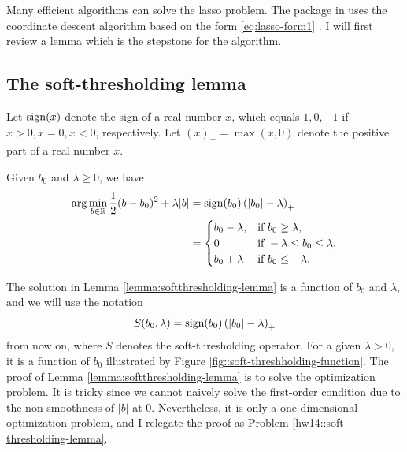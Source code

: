 Many efficient algorithms can solve the lasso problem. The  package in  uses the coordinate descent algorithm based on the form \eqref{eq:lasso-form1} \citep{friedman2007pathwise, friedman2010regularization}. I will first review a lemma which is the stepstone for the algorithm. 


\subsection{The soft-thresholding lemma}


Let $\textup{sign}(x)$ denote the sign of a real number $x$, which equals $1, 0, -1$ if $x>0, x=0, x<0$, respectively. Let $(x)_{+}=\max(x,0)$
denote the positive part of a real number $x$.  

\begin{lemma}
\label{lemma:softthresholding-lemma}Given $b_{0}$ and $\lambda \geq 0$, we have 
\begin{align*}
\arg\min_{b\in \mathbb{R}}\frac{1}{2}(b-b_{0})^{2}+\lambda|b| & =\textup{sign}(b_{0})\left(|b_{0}|-\lambda\right)_{+}\\
 & =\begin{cases}
b_{0}-\lambda, & \text{if }b_{0}\geq\lambda,\\
0 & \text{if }-\lambda\leq b_{0}\leq\lambda,\\
b_{0}+\lambda & \text{if }b_{0}\leq-\lambda . 
\end{cases}
\end{align*}
\end{lemma}



The solution in Lemma \ref{lemma:softthresholding-lemma} is a function
of $b_{0}$ and $\lambda$, and we will use the notation 
\[
S(b_{0},\lambda)=\textup{sign}(b_{0})\left(|b_{0}|-\lambda\right)_{+}
\]
from now on, where $S$ denotes the soft-thresholding operator. For a given $\lambda>0$, it is a function of $b_{0}$
illustrated by Figure \ref{fig::soft-threshholding-function}. The proof of Lemma \ref{lemma:softthresholding-lemma}
is to solve the optimization problem. It is tricky since we cannot naively solve the first-order condition due to the non-smoothness of $|b|$ at $0$. Nevertheless, it is only a one-dimensional optimization problem, and I relegate the proof as Problem \ref{hw14::soft-thresholding-lemma}. 



